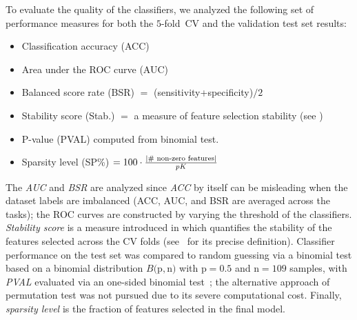 \newcommand{\hsp}{\hspace{-1pt}}
To evaluate the quality of the classifiers, we analyzed the following set of performance measures for both the \mbox{$5$-fold CV} and the validation test set results:
\begin{itemize}\vspace{-3pt}
	\item Classification accuracy (ACC) 
	\item Area under the ROC curve (AUC)
	\item Balanced score rate (BSR) $=$ (sensitivity+specificity)$/2$
	\item Stability score (Stab.) $=$ a measure of feature selection stability (see \cite{Baldassarre:2012, Rasmussen:2012})
	\item P-value (PVAL) computed from binomial test.
	\item Sparsity level (SP\%) $=100\cdot\frac{\left| \text{\# non-zero features} \right|}{pK}$
\end{itemize}\vspace{-3pt}
The\hspace{-1pt} \emph{AUC} and \emph{BSR} are analyzed since \emph{ACC} by itself can be misleading when the dataset labels are imbalanced (ACC, \hsp AUC, and BSR are averaged across the tasks); the ROC curves are constructed by varying the threshold of the classifiers.
\emph{Stability score} is a measure introduced in \cite{Rasmussen:2012} which quantifies the stability of the features selected across the CV folds (see~\cite{Baldassarre:2012, Rasmussen:2012} for its precise definition).
Classifier performance on the test set was compared to random guessing via a binomial test based on a binomial distribution $B($p$,$n$)$ with p${=}0.5$ and n${=}109$ samples, with \emph{PVAL} evaluated via an one-sided binomial test~\cite{Heinzle:2012}; the alternative approach of permutation test was not pursued due to its severe computational \mbox{cost}.
Finally, \emph{sparsity level} is the fraction of features selected in the final model.



